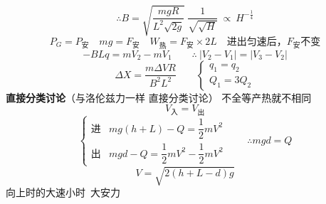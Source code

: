 \[ \therefore B=\sqrt{\frac{mgR}{L^2\sqrt{2g}}}\ \frac{1}{\sqrt{\sqrt{H}}}\ \propto\ H^{-\frac{1}{4}} \]
\[ P_G=P_{\text{安}}\quad mg=F_{\text{安}}\quad W_{\text{热}}=F_{\text{安}}\times 2L\quad \text{进出匀速后，}F_{\text{安}}\text{不变} \]
\[ -BLq=mV_2-mV_1\qquad \therefore\ |V_2-V_1|=|V_3-V_2| \]
\[ \Delta X=\frac{m\Delta VR}{B^2L^2}\qquad \left\{\begin{array}{l} q_1=q_2\\ Q_1=3Q_2\end{array}\right. \]
\textbf{直接分类讨论}（与洛伦兹力一样 直接分类讨论） %
不全等产热就不相同
\[ V_{\text{入}}=V_{\text{出}} \]
\[ \left\{\begin{array}{ll}\text{进} & mg(h+L)-Q=\dfrac{1}{2}mV^2\\[2ex] \text{出} & mgd-Q=\dfrac{1}{2}mV^2-\dfrac{1}{2}mV^2\end{array}\right.\qquad \therefore mgd=Q \]
\[ V=\sqrt{2(h+L-d)g} \]
向上时的大速小时\ 大安力

